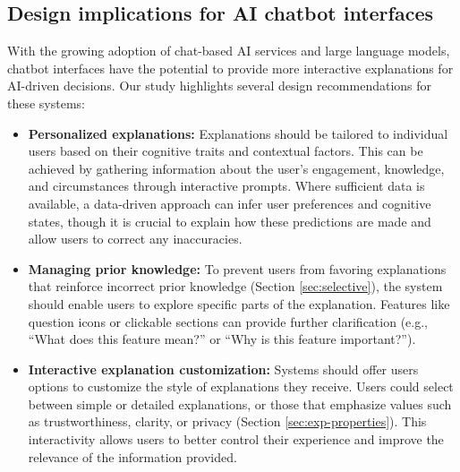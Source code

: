 \subsection{Design implications for AI chatbot interfaces}

With the growing adoption of chat-based AI services and large language models, chatbot interfaces have the potential to provide more interactive explanations for AI-driven decisions. Our study highlights several design recommendations for these systems:

\begin{itemize}
    \item {\bf Personalized explanations:} Explanations should be tailored to individual users based on their cognitive traits and contextual factors. This can be achieved by gathering information about the user's engagement, knowledge, and circumstances through interactive prompts. Where sufficient data is available, a data-driven approach can infer user preferences and cognitive states, though it is crucial to explain how these predictions are made and allow users to correct any inaccuracies.
\item {\bf Managing prior knowledge:} To prevent users from favoring explanations that reinforce incorrect prior knowledge (Section \ref{sec:selective}), the system should enable users to explore specific parts of the explanation. Features like question icons or clickable sections can provide further clarification (e.g., ``What does this feature mean?'' or ``Why is this feature important?'').
\item {\bf Interactive explanation customization:} Systems should offer users options to customize the style of explanations they receive. Users could select between simple or detailed explanations, or those that emphasize values such as trustworthiness, clarity, or privacy (Section \ref{sec:exp-properties}). This interactivity allows users to better control their experience and improve the relevance of the information provided.
\end{itemize}





